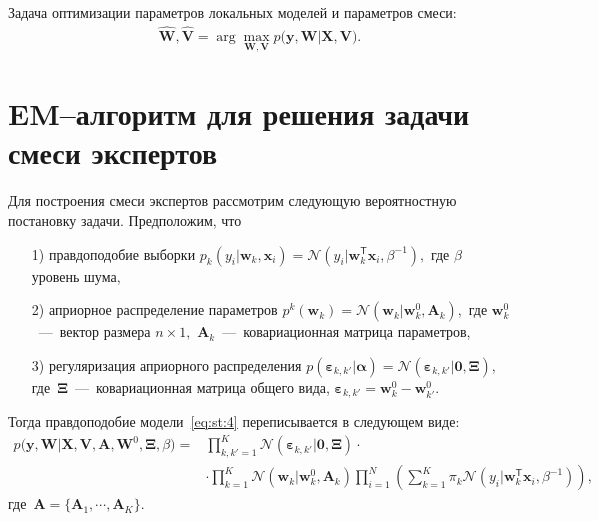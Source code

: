 \documentclass[12pt, twoside]{article}
\numberwithin{equation}{section}
\begin{document}
Задача оптимизации параметров локальных моделей и параметров смеси:
\begin{equation}
\label{eq:st:5}
\begin{aligned}
\hat{\mathbf{W}}, \hat{\mathbf{V}} = \arg\max_{\mathbf{W}, \mathbf{V}} p\bigr(\mathbf{y}, \mathbf{W}|\mathbf{X}, \mathbf{V}\bigr).
\end{aligned}
\end{equation}

\section{EM--алгоритм для решения задачи смеси экспертов}
Для построения смеси экспертов рассмотрим следующую вероятностную постановку задачи. Предположим, что
\begin{enumerate}
	\item[1)] правдоподобие выборки $p_{k}\left(y_{i}|\mathbf{w}_{k}, \mathbf{x}_{i}\right) = \mathcal{N}\left(y_{i}|\mathbf{w}_{k}^{\mathsf{T}}\mathbf{x}_{i}, \beta^{-1}\right),$ где $\beta$ уровень шума,
	\item[2)] априорное распределение параметров $p^{k}\left(\mathbf{w}_{k}\right) = \mathcal{N}\left(\mathbf{w}_{k}|\mathbf{w}^{0}_{k}, \mathbf{A}_{k}\right),$ где $\mathbf{w}^{0}_{k}$~---~вектор размера $n\times1,$ $\mathbf{A}_{k}$~---~ковариационная матрица параметров,
	\item[3)] регуляризация априорного распределения $p\left(\bm{\varepsilon}_{k,k'}|\bm{\alpha}\right) = \mathcal{N}\left(\bm{\varepsilon}_{k,k'}|\mathbf{0},  \bm{\Xi}\right),$ где~$\bm{\Xi}$~---~ковариационная матрица общего вида, $\bm{\varepsilon}_{k,k'} = \mathbf{w}_{k}^{0}-\mathbf{w}_{k'}^{0}.$
\end{enumerate}
Тогда правдоподобие модели~\eqref{eq:st:4} переписывается в следующем виде:
\begin{equation}
\label{eq:em:1}
\begin{aligned}
p\bigr(\mathbf{y}, \mathbf{W}|\mathbf{X}, \mathbf{V}, \textbf{A}, \textbf{W}^{0}, \bm{\Xi}, \beta\bigr) = &\prod_{k,k'=1}^{K}\mathcal{N}\left(\bm{\varepsilon}_{k,k'}|\mathbf{0},  \bm{\Xi}\right)\cdot\\
&\cdot\prod_{k=1}^{K}\mathcal{N}\left(\mathbf{w}_{k}|\mathbf{w}^{0}_{k}, \mathbf{A}_{k}\right)\prod_{i=1}^{N}\left(\sum_{k=1}^{K}\pi_{k}\mathcal{N}\left(y_{i}|\mathbf{w}_{k}^{\mathsf{T}}\mathbf{x}_{i}, \beta^{-1}\right)\right),
\end{aligned}
\end{equation}
где~$\mathbf{A} = \bigr\{\mathbf{A}_1, \cdots, \mathbf{A}_K\bigr\}.$
\end{document}
